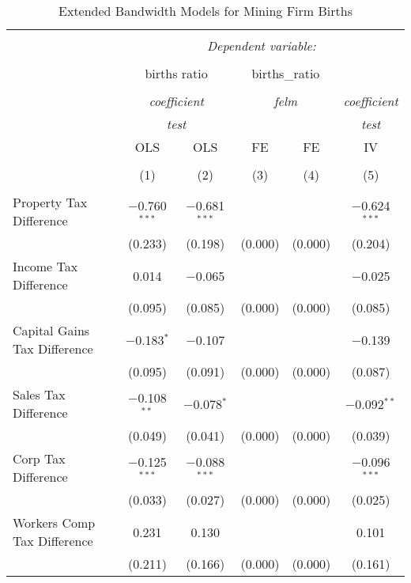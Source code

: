 
\begin{table}[!htbp] \centering 
  \caption{Extended Bandwidth Models for  Mining Firm Births} 
  \label{} 
\begin{tabular}{@{\extracolsep{5pt}}lccccc} 
\\[-1.8ex]\hline 
\hline \\[-1.8ex] 
 & \multicolumn{5}{c}{\textit{Dependent variable:}} \\ 
\cline{2-6} 
\\[-1.8ex] & \multicolumn{2}{c}{births ratio} & \multicolumn{2}{c}{births\_ratio} &   \\ 
\\[-1.8ex] & \multicolumn{2}{c}{\textit{coefficient}} & \multicolumn{2}{c}{\textit{felm}} & \textit{coefficient} \\ 
 & \multicolumn{2}{c}{\textit{test}} & \multicolumn{2}{c}{\textit{}} & \textit{test} \\ 
 & OLS & OLS & FE & FE & IV \\ 
\\[-1.8ex] & (1) & (2) & (3) & (4) & (5)\\ 
\hline \\[-1.8ex] 
 Property Tax Difference & $-$0.760$^{***}$ & $-$0.681$^{***}$ &  &  & $-$0.624$^{***}$ \\ 
  & (0.233) & (0.198) & (0.000) & (0.000) & (0.204) \\ 
  Income Tax Difference & 0.014 & $-$0.065 &  &  & $-$0.025 \\ 
  & (0.095) & (0.085) & (0.000) & (0.000) & (0.085) \\ 
  Capital Gains Tax Difference & $-$0.183$^{*}$ & $-$0.107 &  &  & $-$0.139 \\ 
  & (0.095) & (0.091) & (0.000) & (0.000) & (0.087) \\ 
  Sales Tax Difference & $-$0.108$^{**}$ & $-$0.078$^{*}$ &  &  & $-$0.092$^{**}$ \\ 
  & (0.049) & (0.041) & (0.000) & (0.000) & (0.039) \\ 
  Corp Tax Difference & $-$0.125$^{***}$ & $-$0.088$^{***}$ &  &  & $-$0.096$^{***}$ \\ 
  & (0.033) & (0.027) & (0.000) & (0.000) & (0.025) \\ 
  Workers Comp Tax Difference & 0.231 & 0.130 &  &  & 0.101 \\ 
  & (0.211) & (0.166) & (0.000) & (0.000) & (0.161) \\ 

\end{tabular}
\end{table}
